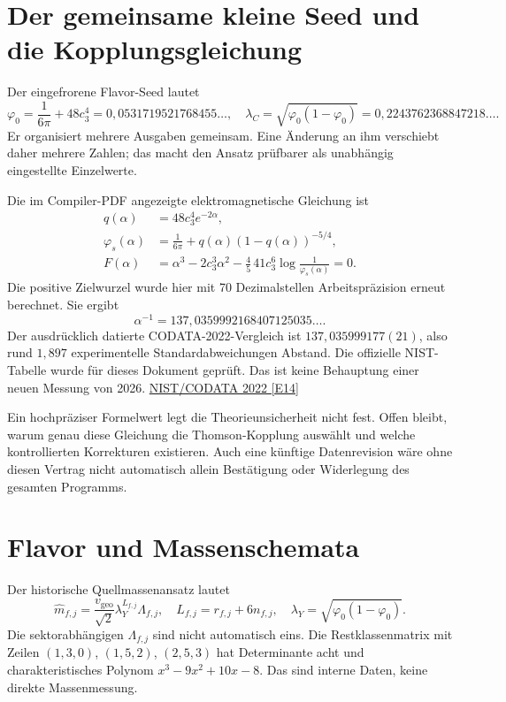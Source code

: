 \section{Der gemeinsame kleine Seed und die Kopplungsgleichung}
Der eingefrorene Flavor-Seed lautet
\begin{equation}
\varphi_0=\frac1{6\pi}+48c_3^4=0{,}0531719521768455\ldots,
\quad\lambda_C=\sqrt{\varphi_0(1-\varphi_0)}=0{,}2243762368847218\ldots.
\end{equation}
Er organisiert mehrere Ausgaben gemeinsam. Eine Änderung an ihm verschiebt daher mehrere Zahlen; das macht den Ansatz prüfbarer als unabhängig eingestellte Einzelwerte.

Die im Compiler-PDF angezeigte elektromagnetische Gleichung ist
\begin{align}
q(\alpha)&=48c_3^4e^{-2\alpha},\\
\varphi_s(\alpha)&=\frac1{6\pi}+q(\alpha)(1-q(\alpha))^{-5/4},\\
F(\alpha)&=\alpha^3-2c_3^3\alpha^2-\frac45\,41c_3^6\log\frac1{\varphi_s(\alpha)}=0.
\end{align}
Die positive Zielwurzel wurde hier mit 70 Dezimalstellen Arbeitspräzision erneut berechnet. Sie ergibt
\begin{equation}
\alpha^{-1}=137{,}0359992168407125035\ldots.
\end{equation}
Der ausdrücklich datierte CODATA-2022-Vergleich ist $137{,}035999177(21)$, also rund $1{,}897$ experimentelle Standardabweichungen Abstand. Die offizielle NIST-Tabelle wurde für dieses Dokument geprüft. Das ist keine Behauptung einer neuen Messung von 2026. \href{https://physics.nist.gov/cuu/Constants/Table/allascii.txt}{NIST/CODATA 2022 [E14]}

Ein hochpräziser Formelwert legt die Theorieunsicherheit nicht fest. Offen bleibt, warum genau diese Gleichung die Thomson-Kopplung auswählt und welche kontrollierten Korrekturen existieren. Auch eine künftige Datenrevision wäre ohne diesen Vertrag nicht automatisch allein Bestätigung oder Widerlegung des gesamten Programms.

\section{Flavor und Massenschemata}
Der historische Quellmassenansatz lautet
\begin{equation}
\widehat m_{f,j}=\frac{v_{\mathrm{geo}}}{\sqrt2}\lambda_Y^{L_{f,j}}\Lambda_{f,j},
\quad L_{f,j}=r_{f,j}+6n_{f,j},\quad\lambda_Y=\sqrt{\varphi_0(1-\varphi_0)}.
\end{equation}
Die sektorabhängigen $\Lambda_{f,j}$ sind nicht automatisch eins. Die Restklassenmatrix mit Zeilen $(1,3,0)$, $(1,5,2)$, $(2,5,3)$ hat Determinante acht und charakteristisches Polynom $x^3-9x^2+10x-8$. Das sind interne Daten, keine direkte Massenmessung.

